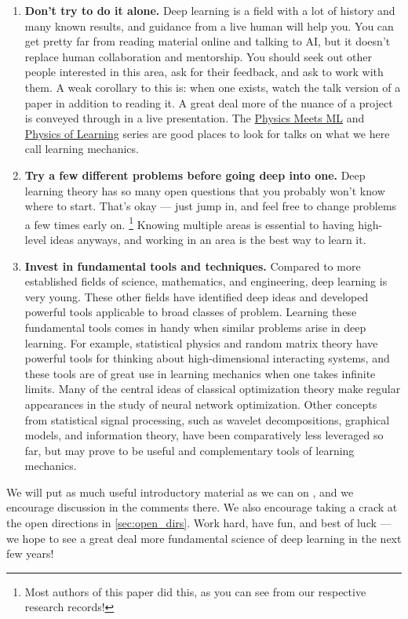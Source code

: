 \begin{enumerate}
    \item
    \textbf{Don't try to do it alone.}
    Deep learning is a field with a lot of history and many known results, and guidance from a live human will help you.
    You can get pretty far from reading material online and talking to AI, but it doesn't replace human collaboration and mentorship.
    You should seek out other people interested in this area, ask for their feedback, and ask to work with them.
    A weak corollary to this is: when one exists, watch the talk version of a paper in addition to reading it.
    A great deal more of the nuance of a project is conveyed through in a live presentation.
    The \href{http://physicsmeetsml.org/}{Physics Meets ML} and \href{https://www.physicsoflearning.org/webinar-series}{Physics of Learning} series are good places to look for talks on what we here call learning mechanics.

    \item
    \textbf{Try a few different problems before going deep into one.}
    Deep learning theory has so many open questions that you probably won't know where to start.
    That's okay --- just jump in, and feel free to change problems a few times early on.%
    \footnote{Most authors of this paper did this, as you can see from our respective research records!}
    Knowing multiple areas is essential to having high-level ideas anyways, and working in an area is the best way to learn it.

    \item
    \textbf{Invest in fundamental tools and techniques.}
    Compared to more established fields of science, mathematics, and engineering, deep learning is very young.
    These other fields have identified deep ideas and developed powerful tools applicable to broad classes of problem.
    Learning these fundamental tools comes in handy when similar problems arise in deep learning.
    For example, statistical physics and random matrix theory have powerful tools for thinking about high-dimensional interacting systems, and these tools are of great use in learning mechanics when one takes infinite limits.
    Many of the central ideas of classical optimization theory make regular appearances in the study of neural network optimization.
    Other concepts from statistical signal processing, such as wavelet decompositions, graphical models, and information theory, have been comparatively less leveraged so far, but may prove to be useful and complementary tools of learning mechanics.


\end{enumerate}


We will put as much useful introductory material as we can on \websiteurl, and we encourage discussion in the comments there.
We also encourage taking a crack at the open directions in \cref{sec:open_dirs}.
Work hard, have fun, and best of luck --- we hope to see a great deal more fundamental science of deep learning in the next few years!
